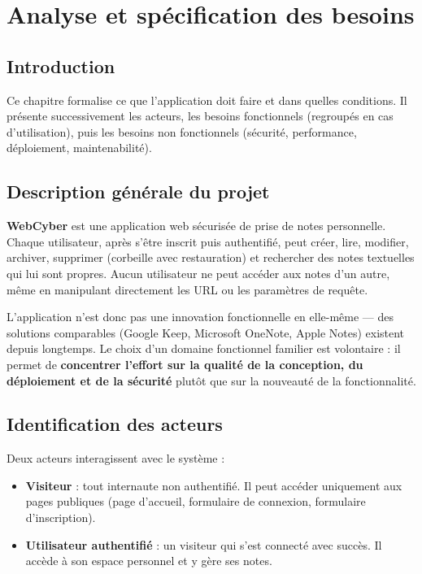 \chapter{Analyse et spécification des besoins}

\section*{Introduction}

Ce chapitre formalise ce que l'application doit faire et dans quelles
conditions. Il présente successivement les acteurs, les besoins
fonctionnels (regroupés en cas d'utilisation), puis les besoins non
fonctionnels (sécurité, performance, déploiement, maintenabilité).

\section{Description générale du projet}

\textbf{WebCyber} est une application web sécurisée de prise de notes
personnelle. Chaque utilisateur, après s'être inscrit puis authentifié,
peut créer, lire, modifier, archiver, supprimer (corbeille avec
restauration) et rechercher des notes textuelles qui lui sont propres.
Aucun utilisateur ne peut accéder aux notes d'un autre, même en
manipulant directement les URL ou les paramètres de requête.

L'application n'est donc pas une innovation fonctionnelle en elle-même
--- des solutions comparables (Google Keep, Microsoft OneNote, Apple
Notes) existent depuis longtemps. Le choix d'un domaine fonctionnel
familier est volontaire : il permet de \textbf{concentrer l'effort sur
la qualité de la conception, du déploiement et de la sécurité} plutôt
que sur la nouveauté de la fonctionnalité.

\section{Identification des acteurs}

Deux acteurs interagissent avec le système :

\begin{itemize}
  \item \textbf{Visiteur} : tout internaute non authentifié. Il peut
        accéder uniquement aux pages publiques (page d'accueil,
        formulaire de connexion, formulaire d'inscription).
  \item \textbf{Utilisateur authentifié} : un visiteur qui s'est
        connecté avec succès. Il accède à son espace personnel et y
        gère ses notes.
\end{itemize}


